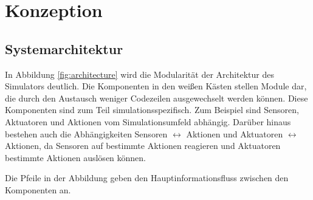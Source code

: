 \chapter{Konzeption}\label{chapter:concept}




\section{Systemarchitektur}\label{sec:architecture}

In Abbildung \ref{fig:architecture} wird die Modularität der Architektur des Simulators deutlich. Die Komponenten in den weißen Kästen stellen Module dar, die durch den Austausch weniger Codezeilen ausgewechselt werden können. Diese Komponenten sind zum Teil simulationsspezifisch. Zum Beispiel sind Sensoren, Aktuatoren und Aktionen vom Simulationsumfeld abhängig. Darüber hinaus bestehen auch die Abhängigkeiten Sensoren $\leftrightarrow$ Aktionen und Aktuatoren $\leftrightarrow$ Aktionen, da Sensoren auf bestimmte Aktionen reagieren und Aktuatoren bestimmte Aktionen auslösen können.

Die Pfeile in der Abbildung geben den Hauptinformationsfluss zwischen den Komponenten an.

